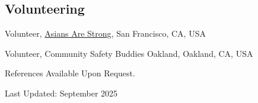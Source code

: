 \documentclass[11pt,letterpaper]{article}
\begin{document}
\subsection{Volunteering}
\begin{tablist}
  \item[2024–2025] \tab{}Volunteer, \href{https://asiansarestrong.org/}{Asians Are Strong}, San Francisco, CA, USA
  \item[2024–2025] \tab{}Volunteer, Community Safety Buddies Oakland, Oakland, CA, USA
\end{tablist}

\vspace{1.0\baselineskip}
References Available Upon Request.\par\vspace{.2\baselineskip}
{\footnotesize Last Updated: September 2025}
\end{document}
